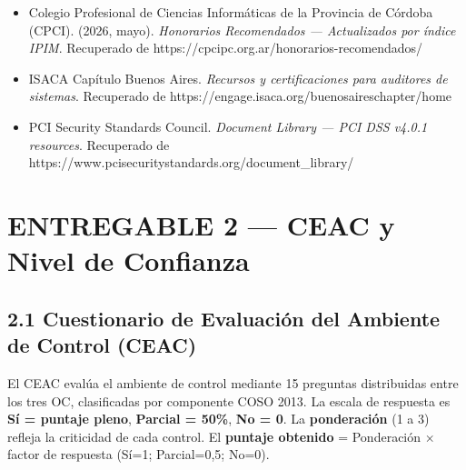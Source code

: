 \documentclass[11pt,a4paper]{article}
\begin{document}
\begin{itemize}[leftmargin=*]
  \item Colegio Profesional de Ciencias Informáticas de la Provincia de Córdoba (CPCI). (2026, mayo). \textit{Honorarios Recomendados — Actualizados por índice IPIM}. Recuperado de https://cpcipc.org.ar/honorarios-recomendados/
  \item ISACA Capítulo Buenos Aires. \textit{Recursos y certificaciones para auditores de sistemas}. Recuperado de https://engage.isaca.org/buenosaireschapter/home
  \item PCI Security Standards Council. \textit{Document Library — PCI DSS v4.0.1 resources}. Recuperado de https://www.pcisecuritystandards.org/document_library/
\end{itemize}

\clearpage

\section{ENTREGABLE 2 — CEAC y Nivel de Confianza}

\subsection{2.1 Cuestionario de Evaluación del Ambiente de Control (CEAC)}

El CEAC evalúa el ambiente de control mediante 15 preguntas distribuidas entre los tres OC, clasificadas por componente COSO 2013. La escala de respuesta es \textbf{Sí = puntaje pleno}, \textbf{Parcial = 50\%}, \textbf{No = 0}. La \textbf{ponderación} (1 a 3) refleja la criticidad de cada control. El \textbf{puntaje obtenido} = Ponderación × factor de respuesta (Sí=1; Parcial=0,5; No=0).
\end{document}

